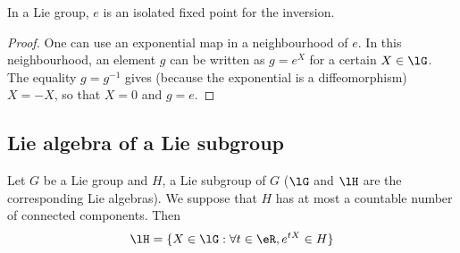\begin{lemma}
	In a Lie group, $e$ is an isolated fixed point for the inversion.
\end{lemma}

\begin{proof}
	One can use an exponential map in a neighbourhood of $e$. In this neighbourhood, an element $g$ can be written as $g=e^X$ for a certain $X\in\lG$. The equality $g=g^{-1}$ gives (because the exponential is a diffeomorphism) $X=-X$, so that $X=0$ and $g=e$.
\end{proof}

\subsection{Lie algebra of a Lie subgroup}


\begin{proposition}     \label{PROPooCRKMooIIbKUM}
	Let $G$ be a Lie group and $H$, a Lie subgroup of $G$ ($\lG$ and $\lH$ are the corresponding Lie algebras). We suppose that $H$ has at most a countable number of connected components. Then
	\begin{equation}
		\lH=\{ X\in\lG:\forall t\in\eR,e^{tX}\in H \}
	\end{equation}
\end{proposition}

